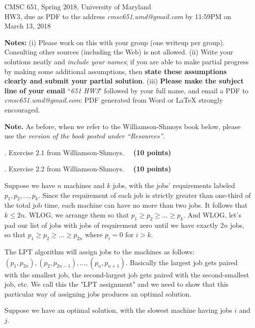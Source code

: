 \documentclass{article}[11pt]
\begin{document}
\newcommand{\E}{\textbf{E}}
\newcommand{\var}{\textbf{var}}

\begin{center}
CMSC 651, Spring 2018, University of Maryland \\
HW3, due as PDF to the address \emph{cmsc651.umd@gmail.com} by 11:59PM on March 13, 2018
\end{center}

\medskip \noindent
\textbf{Notes:} (i) Please work on this with your group (one writeup per group). Consulting
other sources (including the Web) is not allowed. 
(ii) Write your solutions neatly and \emph{include your names}; if you are able to make partial progress by making some
additional assumptions, then \textbf{state these assumptions clearly and submit
your partial solution}. 
(iii) \textbf{Please make the subject line of your email} ``\textit{651 HW3}" followed by
your full name, and email a PDF to \emph{cmsc651.umd@gmail.com}: PDF generated from Word or LaTeX strongly encouraged. 

\medskip \smallskip \noindent \textbf{Note.} As before, when we refer to the Williamson-Shmoys book below, please use the \emph{version of the book posted under ``Resources''}. 

\medskip {}. 
Exercise 2.1 from Williamson-Shmoys. ~~\textbf{(10 points)}


\medskip {}. 
Exercise 2.2 from Williamson-Shmoys. ~~\textbf{(10 points)}

Suppose we have $n$ machines and $k$ jobs, with the jobs' requirements labeled $p_1, p_2, \ldots, p_k$. Since the requirement of each job is strictly greater than one-third of the total job time, each machine can have no more than two jobs. It follows that $k \leq 2n$. WLOG, we arrange them so that $p_1 \geq p_2 \geq \ldots \geq p_k$. And WLOG, let's pad our list of jobs with jobs of requirement zero until we have exactly $2n$ jobs, so that $p_1 \geq p_2 \geq \ldots \geq p_{2n}$ where $p_i = 0$ for $i > k$.

The LPT algorithm will assign jobs to the machines as follows: $(p_1, p_{2n}), (p_2, p_{2n-1}), \ldots, (p_n, p_{n+1})$. Basically the largest job gets paired with the smallest job, the second-largest job gets paired with the second-smallest job, etc. We call this the "LPT assignment" and we need to show that this particular way of assigning jobs produces an optimal solution.

Suppose we have an optimal solution, with the slowest machine having jobs $i$ and $j$.
\end{document}
